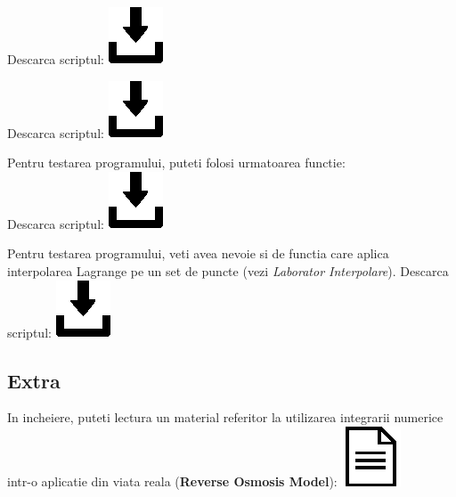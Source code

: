 \documentclass{article}
\begin{document}
\tabto{0.5cm} Descarca scriptul:
\href{https://github.com/Iulian277/Numerical-Differentiation-and-Integration/blob/main/Integrare/Newton-Cotes/Simpson_simplu.m}{\includegraphics[scale=0.35]{download_button}}


\tabto{0.5cm} Descarca scriptul:
\href{https://github.com/Iulian277/Numerical-Differentiation-and-Integration/blob/main/Integrare/Newton-Cotes/Simpson_compus.m}{\includegraphics[scale=0.35]{download_button}}


Pentru testarea programului, puteti folosi urmatoarea functie:\\
\tabto{0.5cm} Descarca scriptul:
\href{https://github.com/Iulian277/Numerical-Differentiation-and-Integration/blob/main/Integrare/Newton-Cotes/testare_Newton_Cotes.m}{\includegraphics[scale=0.35]{download_button}}


Pentru testarea programului, veti avea nevoie si de functia care aplica interpolarea Lagrange pe un set de puncte (vezi \textit{Laborator Interpolare}).
\tabto{0.5cm} Descarca scriptul:
\href{https://github.com/Iulian277/Numerical-Differentiation-and-Integration/blob/main/Integrare/Newton-Cotes/lagrange.m}{\includegraphics[scale=0.35]{download_button}}



\subsection{Extra}
\tab In incheiere, puteti lectura un material referitor la utilizarea integrarii numerice intr-o aplicatie din viata reala (\textbf{Reverse Osmosis Model}): \href{https://github.com/Iulian277/Numerical-Differentiation-and-Integration/blob/main/Reverse_Osmosis_Model_Integration.pdf}{\includegraphics[scale=0.4]{document_button}}
\end{document}
